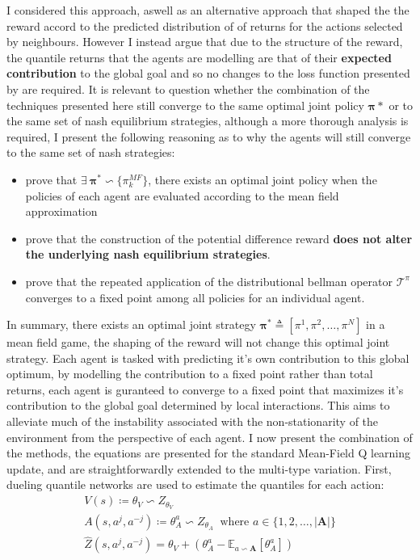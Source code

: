 I considered this approach, aswell as an alternative approach that shaped the the reward accord to the
predicted distribution of of returns for the actions selected by neighbours. However I instead argue that
due to the structure of the reward, the quantile returns that the agents are modelling are that of their
\textbf{expected contribution} to the global goal and so no changes to the loss function
presented by \cite{Sriram2020} are required. It is relevant to question whether the combination
of the techniques presented here still converge to the same optimal joint policy $\mathbf{\pi}*$ or 
to the same set of nash equilibrium strategies, although a more thorough analysis is required,
I present the following reasoning as to why the agents will still converge to the same set of
nash strategies:
\begin{itemize}
    \item \cite{Yang2018} prove that $\exists \: \boldsymbol \pi^* \backsim \{\pi_k^{MF}\}$, there exists
        an optimal joint policy when the policies of each agent are evaluated according to the
        mean field approximation
    \item \cite{Devlin2014} prove that the construction of the potential difference reward \textbf{does not
    alter the underlying nash equilibrium strategies}.
    \item \cite{Dabney2017} prove that the repeated application of the distributional bellman operator 
    $\mathcal{T}^\pi$ converges to a fixed point among all policies for an individual agent.
\end{itemize}
In summary, there exists an optimal joint strategy $\boldsymbol \pi^*  \triangleq [\pi^1, \pi^2, \hdots, \pi^N]$ in a mean field game,
the shaping of the reward will not change this optimal joint strategy. Each agent is tasked with predicting
it's own contribution to this global optimum, by modelling the contribution
to a fixed point rather than total returns, each agent is guranteed to converge to a fixed point that
maximizes it's contribution to the global goal determined by local interactions. This aims to alleviate much of the instability associated with 
the non-stationarity of the environment from the perspective of each agent. 
I now present the combination of the methods, the equations are presented for the
standard Mean-Field Q learning update, and are straightforwardly extended to the 
multi-type variation.
First, dueling quantile networks are used to estimate the quantiles for each action:
\begin{equation}
    \begin{gathered}
        V(s) \coloneqq \theta_V \backsim Z_{\theta_V} \\
        A(s,a^j, a^{-j}) \coloneqq \theta_{A}^a  \backsim Z_{\theta_A}\;\; \text{where } a \in \{1,2, \hdots, \vert \mathbf{A} \vert \} \\
        \hat{Z}(s,a^j, a^{-j}) = \theta_V + (\theta_{A}^a - \mathbb{E}_{a \backsim \mathbf{A}}[\theta_{A}^{a}])
    \end{gathered}
\end{equation}
